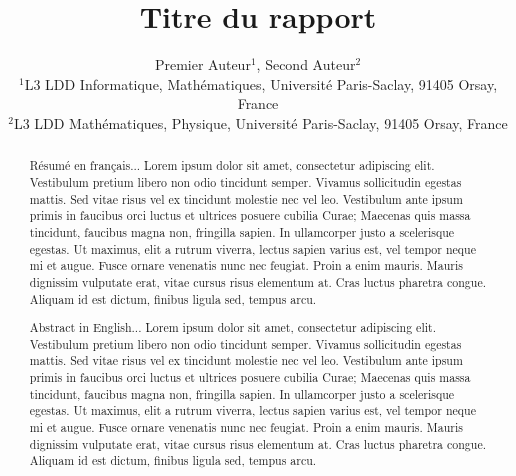 \documentclass[a4paper]{article}
\title{Titre du rapport}
\author{Premier Auteur$^{1}$, Second Auteur$^{2}$  \\
        \small $^{1}$L3 LDD Informatique, Mathématiques, Université Paris-Saclay, 91405 Orsay, France \\
        \small $^{2}$L3 LDD Mathématiques, Physique, Université Paris-Saclay, 91405 Orsay, France \\
}
\date{} %
\begin{document}

\maketitle


\begin{abstract}
{\color{blue}Résumé en français...}
Lorem ipsum dolor sit amet, consectetur adipiscing elit. Vestibulum pretium libero non odio tincidunt semper. Vivamus sollicitudin egestas mattis. Sed vitae risus vel ex tincidunt molestie nec vel leo. Vestibulum ante ipsum primis in faucibus orci luctus et ultrices posuere cubilia Curae; Maecenas quis massa tincidunt, faucibus magna non, fringilla sapien. In ullamcorper justo a scelerisque egestas. Ut maximus, elit a rutrum viverra, lectus sapien varius est, vel tempor neque mi et augue. Fusce ornare venenatis nunc nec feugiat. Proin a enim mauris. Mauris dignissim vulputate erat, vitae cursus risus elementum at. Cras luctus pharetra congue. Aliquam id est dictum, finibus ligula sed, tempus arcu. 
\end{abstract} 
\hspace{10pt}

\begin{abstract}
{\color{blue}Abstract in English... }
Lorem ipsum dolor sit amet, consectetur adipiscing elit. Vestibulum pretium libero non odio tincidunt semper. Vivamus sollicitudin egestas mattis. Sed vitae risus vel ex tincidunt molestie nec vel leo. Vestibulum ante ipsum primis in faucibus orci luctus et ultrices posuere cubilia Curae; Maecenas quis massa tincidunt, faucibus magna non, fringilla sapien. In ullamcorper justo a scelerisque egestas. Ut maximus, elit a rutrum viverra, lectus sapien varius est, vel tempor neque mi et augue. Fusce ornare venenatis nunc nec feugiat. Proin a enim mauris. Mauris dignissim vulputate erat, vitae cursus risus elementum at. Cras luctus pharetra congue. Aliquam id est dictum, finibus ligula sed, tempus arcu. 
\end{abstract}
\end{document}
